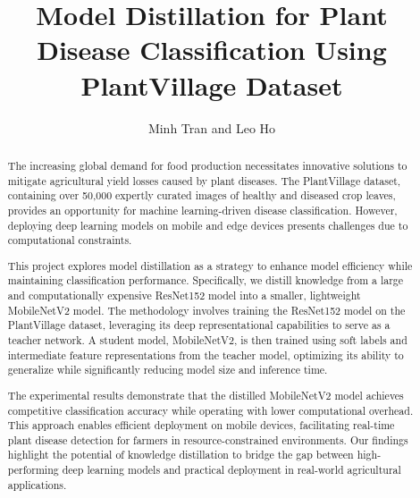 \documentclass{article}
\title{Model Distillation for Plant Disease Classification Using PlantVillage Dataset}
\author{Minh Tran and Leo Ho}
\date{}
\begin{document}
\maketitle

\begin{abstract}
The increasing global demand for food production necessitates innovative solutions to mitigate agricultural yield losses caused by plant diseases. The PlantVillage dataset, containing over 50,000 expertly curated images of healthy and diseased crop leaves, provides an opportunity for machine learning-driven disease classification. However, deploying deep learning models on mobile and edge devices presents challenges due to computational constraints. 

This project explores model distillation as a strategy to enhance model efficiency while maintaining classification performance. Specifically, we distill knowledge from a large and computationally expensive ResNet152 model into a smaller, lightweight MobileNetV2 model. The methodology involves training the ResNet152 model on the PlantVillage dataset, leveraging its deep representational capabilities to serve as a teacher network. A student model, MobileNetV2, is then trained using soft labels and intermediate feature representations from the teacher model, optimizing its ability to generalize while significantly reducing model size and inference time.

The experimental results demonstrate that the distilled MobileNetV2 model achieves competitive classification accuracy while operating with lower computational overhead. This approach enables efficient deployment on mobile devices, facilitating real-time plant disease detection for farmers in resource-constrained environments. Our findings highlight the potential of knowledge distillation to bridge the gap between high-performing deep learning models and practical deployment in real-world agricultural applications.
\end{abstract}
\end{document}
